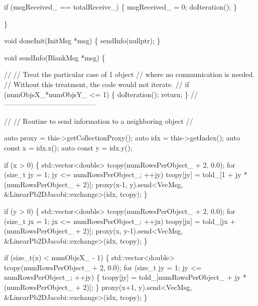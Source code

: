 \begin{DoxyCodeInclude}
    \textcolor{keywordflow}{if} (msgReceived\_ == totalReceive\_) \{
      msgReceived\_ = 0;
      doIteration();
    \}

  \}

  \textcolor{keywordtype}{void} doneInit(InitMsg *msg) \{
    sendInfo(\textcolor{keyword}{nullptr});
  \}

  \textcolor{keywordtype}{void} sendInfo(BlankMsg *msg) \{

    \textcolor{comment}{//}
    \textcolor{comment}{// Treat the particular case of 1 object}
    \textcolor{comment}{// where no communication is needed.}
    \textcolor{comment}{// Without this treatment, the code would not iterate.}
    \textcolor{comment}{//}
    \textcolor{keywordflow}{if} (numObjsX\_*numObjsY\_ <= 1) \{
      doIteration();
      \textcolor{keywordflow}{return};
    \}
    \textcolor{comment}{//---------------------------------------}

    \textcolor{comment}{//}
    \textcolor{comment}{// Routine to send information to a neighboring object}
    \textcolor{comment}{//}

    \textcolor{keyword}{auto} proxy = this->getCollectionProxy();
    \textcolor{keyword}{auto} idx = this->getIndex();
    \textcolor{keyword}{auto} \textcolor{keyword}{const} x = idx.x();
    \textcolor{keyword}{auto} \textcolor{keyword}{const} y = idx.y();

    \textcolor{keywordflow}{if} (x > 0) \{
      std::vector<double> tcopy(numRowsPerObject\_ + 2, 0.0);
      \textcolor{keywordflow}{for} (\textcolor{keywordtype}{size\_t} jy = 1; jy <= numRowsPerObject\_; ++jy)
        tcopy[jy] = told\_[1 + jy * (numRowsPerObject\_ + 2)];
      proxy(x-1, y).send<VecMsg, &LinearPb2DJacobi::exchange>(idx, tcopy);
    \}

    \textcolor{keywordflow}{if} (y > 0) \{
      std::vector<double> tcopy(numRowsPerObject\_ + 2, 0.0);
      \textcolor{keywordflow}{for} (\textcolor{keywordtype}{size\_t} jx = 1; jx <= numRowsPerObject\_; ++jx)
        tcopy[jx] = told\_[jx + (numRowsPerObject\_ + 2)];
      proxy(x, y-1).send<VecMsg, &LinearPb2DJacobi::exchange>(idx, tcopy);
    \}

    \textcolor{keywordflow}{if} (\textcolor{keywordtype}{size\_t}(x) < numObjsX\_ - 1) \{
      std::vector<double> tcopy(numRowsPerObject\_ + 2, 0.0);
      \textcolor{keywordflow}{for} (\textcolor{keywordtype}{size\_t} jy = 1; jy <= numRowsPerObject\_; ++jy) \{
        tcopy[jy] = told\_[numRowsPerObject\_ +
                          jy * (numRowsPerObject\_ + 2)];
      \}
      proxy(x+1, y).send<VecMsg, &LinearPb2DJacobi::exchange>(idx, tcopy);
    \}


\end{DoxyCodeInclude}
